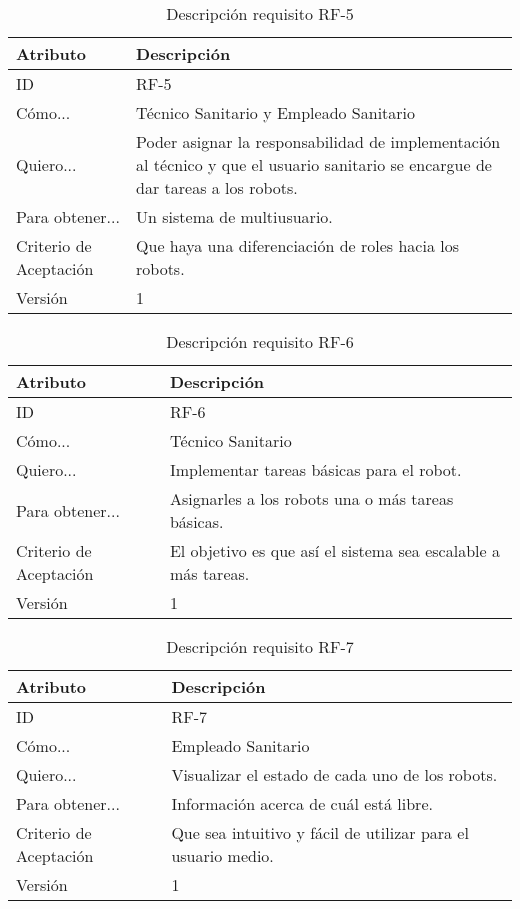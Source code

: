 \begin{table}[H]
    \label{tab:reqC1}
 	\caption{Descripción requisito RF-5}
	\centering
	
	\begin{tabular}{C{3cm}|C{12cm}}
 		\toprule
 		\textbf{Atributo} & \textbf{Descripción} \\
 		\midrule
 	    ID & RF-5 \\
 	    Cómo... & Técnico Sanitario y Empleado Sanitario \\
 	    Quiero... & Poder asignar la responsabilidad de implementación al técnico y que el usuario sanitario se encargue de dar tareas a los robots. \\
 	    Para obtener... & Un sistema de multiusuario.  \\
 	    Criterio de Aceptación & Que haya una diferenciación de roles hacia los robots. \\
 	    Versión & 1 \\
 		\bottomrule
 		\end{tabular}
\end{table}

\begin{table}[H]
    \label{tab:reqC2}
 	\caption{Descripción requisito RF-6}
	\centering
	
	\begin{tabular}{C{3cm}|C{12cm}}
 		\toprule
 		\textbf{Atributo} & \textbf{Descripción} \\
 		\midrule
 	    ID & RF-6 \\
 	    Cómo... & Técnico Sanitario \\
 	    Quiero... & Implementar tareas básicas para el robot. \\
 	    Para obtener... & Asignarles a los robots una o más tareas básicas.  \\
 	    Criterio de Aceptación & El objetivo es que así el sistema sea escalable a más tareas. \\
 	    Versión & 1 \\
 		\bottomrule
 		\end{tabular}
\end{table}

\begin{table}[H]
    \label{tab:reqJ1}
 	\caption{Descripción requisito RF-7}
	\centering
	
	\begin{tabular}{C{3cm}|C{12cm}}
 		\toprule
 		\textbf{Atributo} & \textbf{Descripción} \\
 		\midrule
 	    ID & RF-7 \\
 	    Cómo... & Empleado Sanitario \\
 	    Quiero... & Visualizar el estado de cada uno de los robots. \\
 	    Para obtener... & Información acerca de cuál está libre.  \\
 	    Criterio de Aceptación & Que sea intuitivo y fácil de utilizar para el usuario medio. \\
 	    Versión & 1 \\
 		\bottomrule
 		\end{tabular}
\end{table}

